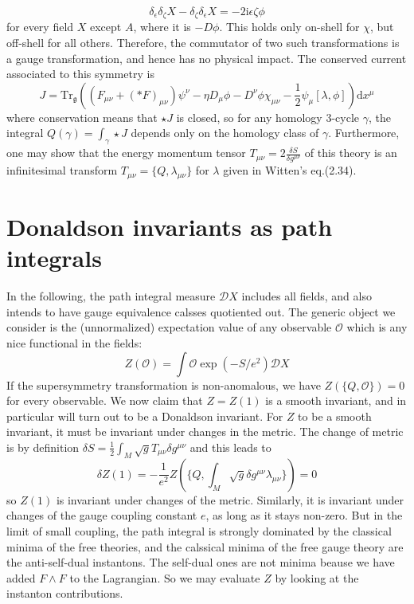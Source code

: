 \[
	\delta_\epsilon\delta_\zeta X - \delta_\zeta\delta_\epsilon X =
	-2\mathrm{i}\epsilon\zeta\phi
\] 
for every field $X$ except  $A$, where it is  $-D\phi$. This holds only on-shell
for  $\chi$, but off-shell for all others. Therefore, the commutator of two such
transformations is a gauge transformation, and hence has no physical impact. The
conserved current associated to this symmetry is 
 \[
	 J = \mathrm{Tr}_\mathfrak{g}\left((F_{\mu\nu} + (\ast F)_{\mu\nu})\psi^\nu
		 - \eta D_\mu \phi - D^\nu\phi \chi_{\mu\nu} -
	 \frac{1}{2}\psi_\mu[\lambda,\phi]\right)\mathrm{d}x^\mu
\] 
where conservation means that $\star J$ is closed, so for any homology 3-cycle
 $\gamma$, the integral  $Q(\gamma) = \int_\gamma \star J$ depends only on the
 homology class of  $\gamma$. Furthermore, one may show that the energy momentum
 tensor  $T_{\mu\nu}= 2 \frac{\delta S}{\delta g^{\mu\nu}}$ of this theory is an
 infinitesimal transform $T_{\mu\nu}=\{Q,\lambda_{\mu\nu}\}$ for $\lambda$ given
 in Witten's eq.(2.34). 

\section{Donaldson invariants as path integrals}
In the following, the path integral measure $\mathcal{D}X$ includes all fields,
and also intends to have gauge equivalence calsses quotiented out. The generic
object we consider is the (unnormalized) expectation value of any observable
$\mathcal{O}$ which is any nice functional in the fields:
\[
Z(\mathcal{O}) = \int \mathcal{O} \exp(-S /e^2) \mathcal{D}X
\] 
If the supersymmetry transformation is non-anomalous, we have
$Z(\{Q,\mathcal{O}\})= 0$ for every observable. We now claim that $Z=Z(1)$ is a
smooth invariant, and in particular will turn out to be a Donaldson invariant.
For  $Z$ to be a smooth invariant, it must be invariant under changes in the
metric. The change of metric is by definition  $\delta
S=\frac{1}{2}\int_M\sqrt{g} T_{\mu\nu}\delta g^{\mu\nu}$ and this leads to
\[
	\delta Z(1) = -\frac{1}{e^2}Z(\{Q,\int_M \sqrt{g}\delta
	g^{\mu\nu}\lambda_{\mu\nu}\}) = 0
\] 
so $Z(1)$ is invariant under changes of the metric. Similarly, it is invariant
under changes of the gauge coupling constant  $e$,   as long as it stays
non-zero. But in the limit of small coupling, the path integral is strongly
dominated by the classical minima of the free theories, and the calssical minima
of the free gauge theory are the anti-self-dual instantons. The self-dual ones
are not minima beause we have added $F\wedge F$ to the Lagrangian. So we may
evaluate  $Z$ by looking at the instanton contributions. 


